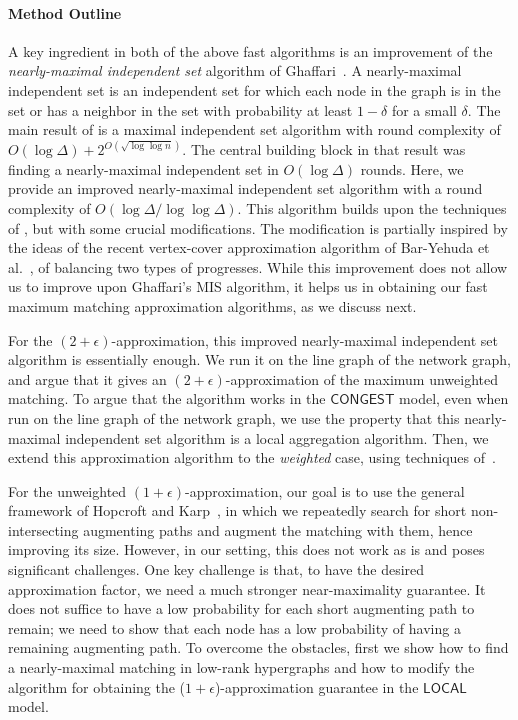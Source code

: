 \documentclass[11pt]{article}
\begin{document}
\paragraph{Method Outline}
A key ingredient in both of the above fast algorithms is an improvement of the \emph{nearly-maximal independent set} algorithm of Ghaffari~\cite{Ghaffari2016}. A nearly-maximal independent set is an independent set for which each node in the graph is in the set or has a neighbor in the set with probability at least $1-\delta$ for a small $\delta$.
The main result of \cite{Ghaffari2016} is a maximal independent set algorithm with round complexity of $O(\log\Delta)+2^{O(\sqrt{\log\log n})}$. The central building block in that result was finding a nearly-maximal independent set in $O(\log\Delta)$ rounds. Here, we provide an improved nearly-maximal independent set algorithm with a round complexity of $O(\log\Delta/\log\log \Delta)$. This algorithm builds upon the techniques of \cite{Ghaffari2016}, but with some crucial modifications. The modification is partially inspired by the ideas of the recent vertex-cover approximation algorithm of Bar-Yehuda et al.~\cite{bar2016distributed}, of balancing two types of progresses. While this improvement does not allow us to improve upon Ghaffari's MIS algorithm, it helps us in obtaining our fast maximum matching approximation algorithms, as we discuss next. 

For the $(2+\epsilon)$-approximation, this improved nearly-maximal independent set algorithm is essentially enough. We run it on the line graph of the network graph, and argue that it gives an $(2+\epsilon)$-approximation of the maximum unweighted matching. To argue that the algorithm works in the $\mathsf{CONGEST}$ model, even when run on the line graph of the network graph, we use the property that this nearly-maximal independent set algorithm is a local aggregation algorithm. Then, we extend this approximation algorithm to the \emph{weighted} case, using techniques of~\cite{lotker2009distributed,lotkerMatchingImproved}.

For the unweighted $(1+\epsilon)$-approximation, our goal is to use the general framework of Hopcroft and Karp~\cite{HopcroftKarp1973}, in which we repeatedly search for short non-intersecting augmenting paths and augment the matching with them, hence improving its size. However, in our setting, this does not work as is and poses significant challenges. One key challenge is that, to have the desired approximation factor, we need a much stronger near-maximality guarantee. It does not suffice to have a low probability for each short augmenting path to remain; we need to show that each node has a low probability of having a remaining augmenting path. To overcome the obstacles, first we show how to find a nearly-maximal matching in low-rank hypergraphs and how to modify the algorithm for obtaining the ($1+\epsilon$)-approximation guarantee in the $\mathsf{LOCAL}$ model. 
\end{document}

